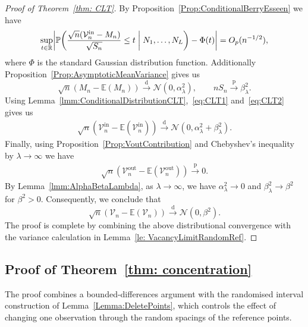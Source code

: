 \documentclass[11pt]{article}
\newcommand{\E}{\mathbb{E}}
\newcommand{\pto}{\xrightarrow{\,\mathrm{p}\,} }
\newcommand{\dto}{\xrightarrow{\,\mathrm{d}\,} }
\begin{document}
\begin{proof}[Proof of Theorem~\ref{thm: CLT}]
By Proposition~\ref{Prop:ConditionalBerryEsseen} we have 
\begin{align}\label{eq:CLT1}
    \sup_{t\in\mathbb{R}} \biggl|\mathbb{P}\biggl(\frac{\sqrt{n}(\mathcal{V}_n^{\mathrm{in}} - M_n)}{\sqrt{S_n}} \leq t\biggm| N_1,\ldots,N_L\biggr) - \Phi(t)\biggr| = O_p(n^{-1/2}),
\end{align}
where $\Phi$ is the standard Gaussian distribution function. Additionally Proposition~\ref{Prop:AsymptoticMeanVariance} gives us
\begin{equation}\label{eq:CLT2}
\sqrt{n} (M_n - \mathbb{E}(M_n)) \dto \mathcal{N}(0,\alpha_\lambda^2),\qquad nS_n \pto \beta_\lambda^2.
\end{equation}
Using Lemma~\ref{lmm:ConditionalDistributionCLT},~\eqref{eq:CLT1} and~\eqref{eq:CLT2} gives us 
\begin{align*}
    \sqrt{n}(\mathcal{V}_n^{\mathrm{in}} - \E(\mathcal{V}_n^{\mathrm{in}}))\dto \mathcal{N}(0, \alpha_\lambda^2 + \beta_\lambda^2).
\end{align*}
Finally, using Proposition~\ref{Prop:VoutContribution} and Chebyshev's inequality by $\lambda\rightarrow\infty$ we have 
\begin{align*}
    \sqrt{n}(\mathcal{V}_n^{\mathrm{out}} - \E(\mathcal{V}_n^{\mathrm{out}})) \pto 0.
\end{align*}
By Lemma~\ref{lmm:AlphaBetaLambda}, as $\lambda \to \infty$, we have $\alpha_\lambda^2 \to 0$ and $\beta_\lambda^2 \to \beta^2$ for $\beta^2 > 0$. Consequently, we conclude that
\[
\sqrt{n}(\mathcal{V}_n - \E(\mathcal{V}_n))\dto\mathcal{N}(0, \beta^2).
\]
The proof is complete by combining the above distributional convergence with the variance calculation in Lemma~\ref{le: VacancyLimitRandomRef}.
\end{proof}

\subsection{Proof of Theorem~\ref{thm: concentration}}

The proof combines a bounded-differences argument with the randomised interval construction of Lemma~\ref{Lemma:DeletePoints}, which controls the effect of changing one observation through the random spacings of the reference points.
\end{document}
